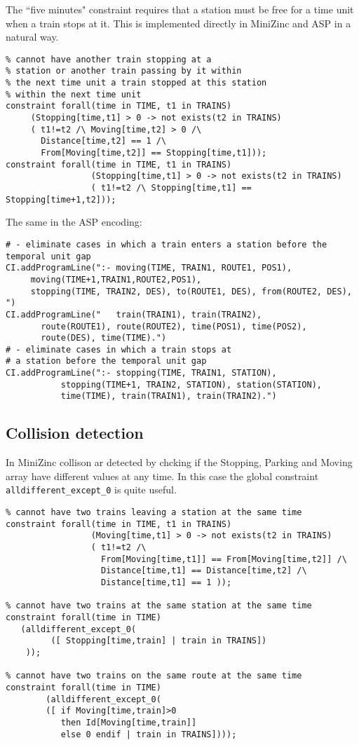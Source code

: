 \documentclass[11pt]{article}
\begin{document}
The ``five minutes" constraint requires that a station must be 
free for a time unit when a train stops at it. This is implemented
directly in MiniZinc and ASP in a natural way.

\begin{verbatim}
% cannot have another train stopping at a 
% station or another train passing by it within 
% the next time unit a train stopped at this station
% within the next time unit 
constraint forall(time in TIME, t1 in TRAINS)
     (Stopping[time,t1] > 0 -> not exists(t2 in TRAINS)
     ( t1!=t2 /\ Moving[time,t2] > 0 /\ 
       Distance[time,t2] == 1 /\ 
       From[Moving[time,t2]] == Stopping[time,t1]));
constraint forall(time in TIME, t1 in TRAINS)
                 (Stopping[time,t1] > 0 -> not exists(t2 in TRAINS)
                 ( t1!=t2 /\ Stopping[time,t1] == Stopping[time+1,t2]));
\end{verbatim}

The same in the ASP encoding:

\begin{verbatim}
# - eliminate cases in which a train enters a station before the temporal unit gap
CI.addProgramLine(":- moving(TIME, TRAIN1, ROUTE1, POS1),
     moving(TIME+1,TRAIN1,ROUTE2,POS1),
     stopping(TIME, TRAIN2, DES), to(ROUTE1, DES), from(ROUTE2, DES), ")
CI.addProgramLine("   train(TRAIN1), train(TRAIN2), 
       route(ROUTE1), route(ROUTE2), time(POS1), time(POS2),
       route(DES), time(TIME).") 
# - eliminate cases in which a train stops at 
# a station before the temporal unit gap
CI.addProgramLine(":- stopping(TIME, TRAIN1, STATION), 
           stopping(TIME+1, TRAIN2, STATION), station(STATION), 
           time(TIME), train(TRAIN1), train(TRAIN2).")
\end{verbatim}

\subsection{Collision detection}


In MiniZinc collison ar detected by chcking if the Stopping, Parking and Moving
array have different values at any time. In this case the global constraint 
\verb+alldifferent_except_0+ is quite useful.

\begin{verbatim}
% cannot have two trains leaving a station at the same time
constraint forall(time in TIME, t1 in TRAINS)
                 (Moving[time,t1] > 0 -> not exists(t2 in TRAINS)
                 ( t1!=t2 /\ 
                   From[Moving[time,t1]] == From[Moving[time,t2]] /\
                   Distance[time,t1] == Distance[time,t2] /\
                   Distance[time,t1] == 1 ));

% cannot have two trains at the same station at the same time 
constraint forall(time in TIME)
   (alldifferent_except_0(
         ([ Stopping[time,train] | train in TRAINS])
    ));

% cannot have two trains on the same route at the same time
constraint forall(time in TIME)
        (alldifferent_except_0(
        ([ if Moving[time,train]>0 
           then Id[Moving[time,train]] 
           else 0 endif | train in TRAINS])));
\end{verbatim}
\end{document}
